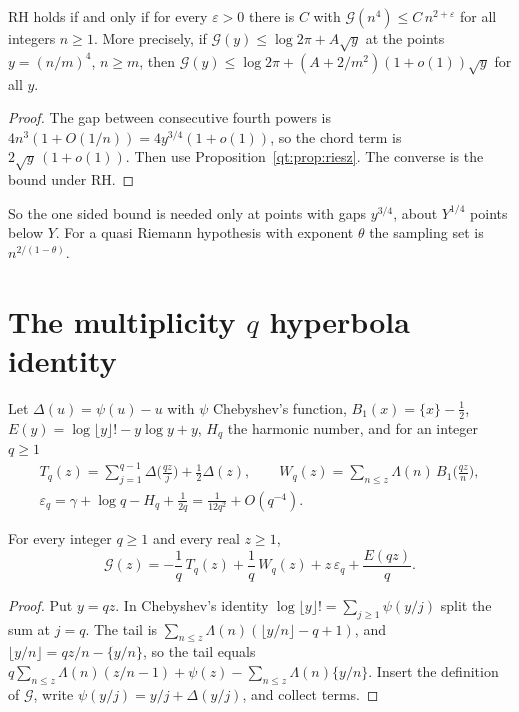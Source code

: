 \begin{corollary}\label{lt:cor:fourth}
RH holds if and only if for every $\varepsilon>0$ there is $C$ with $\mathcal G(n^4)\le C\,n^{2+\varepsilon}$ for all integers $n\ge1$. More precisely, if $\mathcal G(y)\le\log2\pi+A\sqrt y$ at the points $y=(n/m)^4$, $n\ge m$, then $\mathcal G(y)\le\log2\pi+(A+2/m^2)(1+o(1))\sqrt y$ for all $y$.
\end{corollary}

\begin{proof}
The gap between consecutive fourth powers is $4n^3(1+O(1/n))=4y^{3/4}(1+o(1))$, so the chord term is $2\sqrt y\,(1+o(1))$. Then use Proposition~\ref{qt:prop:riesz}. The converse is the bound under RH.
\end{proof}

So the one sided bound is needed only at points with gaps $y^{3/4}$, about $Y^{1/4}$ points below $Y$. For a quasi Riemann hypothesis with exponent $\theta$ the sampling set is $n^{2/(1-\theta)}$.

\section{The multiplicity $q$ hyperbola identity}\label{lt:sec:hyp}
Let $\Delta(u)=\psi(u)-u$ with $\psi$ Chebyshev's function, $B_1(x)=\{x\}-\tfrac12$, $E(y)=\log\lfloor y\rfloor!-y\log y+y$, $H_q$ the harmonic number, and for an integer $q\ge1$
\begin{gather*}
T_q(z)=\sum_{j=1}^{q-1}\Delta\Big(\frac{qz}j\Big)+\frac12\Delta(z),\qquad W_q(z)=\sum_{n\le z}\Lambda(n)\,B_1\Big(\frac{qz}n\Big),\\
\varepsilon_q=\gamma+\log q-H_q+\frac1{2q}=\frac1{12q^2}+O(q^{-4}).
\end{gather*}

\begin{theorem}\label{lt:thm:hyp}
For every integer $q\ge1$ and every real $z\ge1$,
\[
\mathcal G(z)=-\frac1q\,T_q(z)+\frac1q\,W_q(z)+z\,\varepsilon_q+\frac{E(qz)}q .
\]
\end{theorem}

\begin{proof}
Put $y=qz$. In Chebyshev's identity $\log\lfloor y\rfloor!=\sum_{j\ge1}\psi(y/j)$ split the sum at $j=q$. The tail is $\sum_{n\le z}\Lambda(n)(\lfloor y/n\rfloor-q+1)$, and $\lfloor y/n\rfloor=qz/n-\{y/n\}$, so the tail equals $q\sum_{n\le z}\Lambda(n)(z/n-1)+\psi(z)-\sum_{n\le z}\Lambda(n)\{y/n\}$. Insert the definition of $\mathcal G$, write $\psi(y/j)=y/j+\Delta(y/j)$, and collect terms.
\end{proof}


